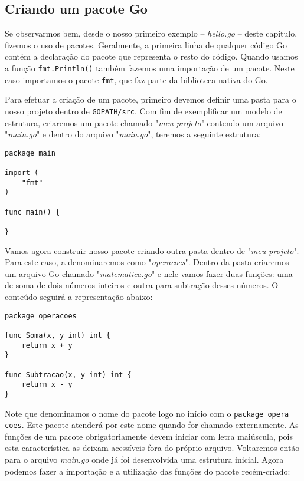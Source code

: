 \documentclass{SBCbookchapter}
\begin{document}
\subsection{Criando um pacote Go}

Se observarmos bem, desde o nosso primeiro exemplo -- \textit{hello.go} -- deste capítulo, fizemos o uso de pacotes. Geralmente, a primeira linha de qualquer código Go contém a declaração do pacote que representa o resto do código. Quando usamos a função \texttt{fmt.Println()} também fazemos uma importação de um pacote. Neste caso importamos o pacote \texttt{fmt}, que faz parte da biblioteca nativa do Go.

Para efetuar a criação de um pacote, primeiro devemos definir uma pasta para o nosso projeto dentro de \texttt{GOPATH/src}. Com fim de exemplificar um modelo de estrutura, criaremos um pacote chamado "\textit{meu-projeto}" contendo um arquivo "\textit{main.go}" e dentro do arquivo "\textit{main.go}", teremos a seguinte estrutura:

\begin{lstlisting}
package main

import (
	"fmt"
)

func main() {
	
}
\end{lstlisting}

Vamos agora construir nosso pacote criando outra pasta dentro de "\textit{meu-projeto}". Para este caso, a denominaremos como "\textit{operacoes}". Dentro da pasta criaremos um arquivo Go chamado "\textit{matematica.go}" e nele vamos fazer duas funções: uma de soma de dois números inteiros e outra para subtração desses números. O conteúdo seguirá a representação abaixo:

\begin{lstlisting}
package operacoes

func Soma(x, y int) int {
	return x + y
}

func Subtracao(x, y int) int {
	return x - y
}
\end{lstlisting}

Note que denominamos o nome do pacote logo no início com o \texttt{package opera\\coes}. Este pacote atenderá por este nome quando for chamado externamente. As funções de um pacote obrigatoriamente devem iniciar com letra maiúscula, pois esta característica as deixam acessíveis fora do próprio arquivo. Voltaremos então para o arquivo \textit{main.go} onde já foi desenvolvida uma estrutura inicial. Agora podemos fazer a importação e a utilização das funções do pacote recém-criado:
\end{document}
